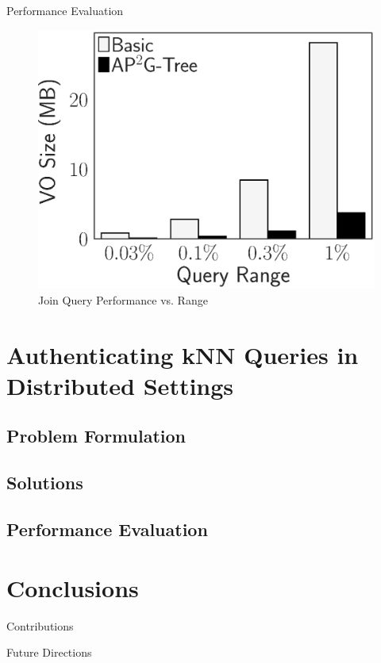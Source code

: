 \documentclass[xcolor={dvipsnames},aspectratio=169,10pt]{beamer}
\begin{document}
\begin{frame}{Performance Evaluation}
\begin{figure}
    \includegraphics[height=\ht\figbox]{exp-figs/access-control/join_vo.eps}
    \caption{Join Query Performance vs. Range}
  \end{figure}
\end{frame}

\section{Authenticating {kNN} Queries in Distributed Settings}

\subsection{Problem Formulation}

\subsection{Solutions}

\subsection{Performance Evaluation}

\section{Conclusions}

\begin{frame}{Contributions}
\end{frame}

\begin{frame}{Future Directions}
\end{frame}
\end{document}
